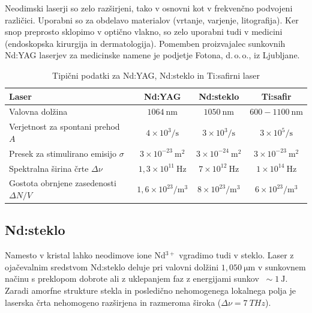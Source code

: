 Neodimski laserji so zelo razširjeni, tako v osnovni kot v frekvenčno 
podvojeni različici. Uporabni so za obdelavo materialov (vrtanje, varjenje, 
litografija). Ker snop preprosto sklopimo v optično vlakno, so 
zelo uporabni tudi v medicini (endoskopska kirurgija in dermatologija). 
Pomemben proizvajalec sunkovnih Nd:YAG laserjev 
za medicinske namene je podjetje Fotona, d.\,o.\,o., iz Ljubljane.

\begin{table}[ht]
\small
\begin{center}
\begin{tabular}{|l|c|c|c|}\hline
Laser & Nd:YAG & Nd:steklo & Ti:safir \\ \hline
Valovna dolžina  & $1064~\si{\nano\metre}$ & $1050~\si{\nano\metre}$ & 
 $600-1100~\si{\nano\metre}$\\ \hline
Verjetnost za spontani prehod $A$ & $4 \times 10^3/\si{\second}$ & $3 \times 10^3/\si{\second}$
& $3 \times 10^5/\si{\second}$\\ \hline
Presek za stimulirano emisijo $\sigma$ & $3 \times 10^{-23}~\si{\metre}^2$ &
$3 \times 10^{-24}~\si{\metre}^2$ & $3 \times 10^{-23}~\si{\metre}^2$\\ \hline
Spektralna širina črte $\Delta \nu$ & $1,3 \times 10^{11}~\si{\hertz}$ &
$7 \times 10^{12}~\si{\hertz}$ & $1 \times 10^{14}~\si{\hertz}$\\ \hline
Gostota obrnjene zasedenosti $\Delta N/V$ & $1,6 \times 10^{23}/\si{\metre}^3$ &
$8 \times 10^{23}/\si{\metre}^3$ & $6 \times 10^{23}/\si{\metre}^3$\\ \hline
\end{tabular}
\caption{Tipični podatki za Nd:YAG, Nd:steklo in Ti:safirni laser}
\label{tab:nd}
\end{center}
\end{table}

\subsection{Nd:steklo}
Namesto v kristal lahko neodimove ione Nd$^{3+}$ vgradimo tudi v steklo. 
Laser z ojačevalnim sredstvom Nd:steklo  deluje 
pri valovni dolžini $1,050~\si{\micro\meter}$ v sunkovnem načinu 
s preklopom dobrote ali z uklepanjem faz z energijami sunkov $~\sim 1~\si{\joule}$.
Zaradi amorfne strukture stekla in posledično 
nehomogenega lokalnega polja je laserska črta nehomogeno razširjena in
razmeroma široka ($\Delta\nu=7~\si{THz}$).


